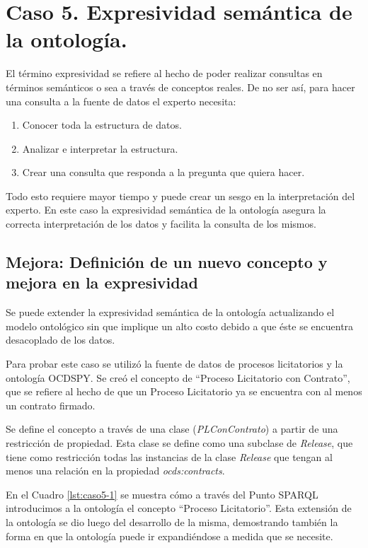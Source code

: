 \section{Caso 5. Expresividad semántica de la ontología. }
\label{section:caso5}

El término expresividad se refiere al hecho de poder realizar consultas en términos semánticos o sea a través de conceptos reales. De no ser así, para hacer una consulta a la fuente de datos el experto necesita:

\begin{enumerate}
    \item Conocer toda la estructura de datos.
    \item Analizar e interpretar la estructura.
    \item Crear una consulta que responda a la pregunta que quiera hacer.
\end{enumerate}

Todo esto requiere mayor tiempo y puede crear un sesgo en la interpretación del experto. En este caso la expresividad semántica de la ontología asegura la correcta interpretación de los datos y facilita la consulta de los mismos.


\subsection{Mejora: Definición de un nuevo concepto y mejora en la expresividad}
Se puede extender la expresividad semántica de la ontología actualizando el modelo ontológico sin que implique un alto costo debido a que éste se encuentra desacoplado de los datos.

Para probar este caso se utilizó la fuente de datos de procesos licitatorios y la ontología OCDSPY.  Se creó el  concepto  de “Proceso Licitatorio con Contrato”, que se refiere al hecho de que un Proceso Licitatorio ya se encuentra con al menos un contrato firmado.

Se define el concepto a través de una clase (\textit{PLConContrato}) a partir de una restricción de propiedad. Esta clase se define como una subclase de \textit{Release}, que tiene como restricción todas las instancias de la clase \textit{Release} que tengan al menos una relación en la propiedad \textit{ocds:contracts}.

En el Cuadro \ref{lst:caso5-1} se muestra cómo a través del Punto SPARQL introducimos a la ontología el concepto “Proceso Licitatorio”. Esta extensión de la ontología se dio luego del desarrollo de la misma, demostrando también la forma en que la ontología puede ir expandiéndose a medida que se necesite.


